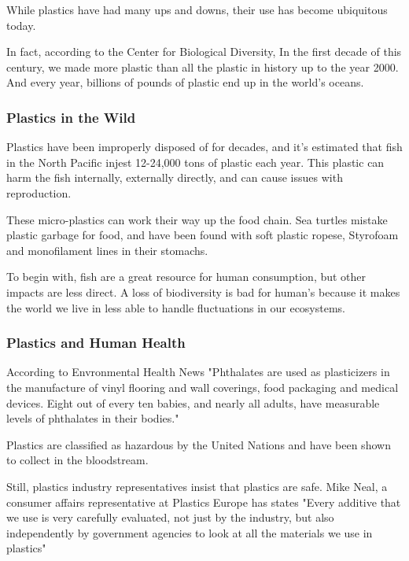 \documentclass[paper=a4, fontsize=11pt]{article}
\begin{document}
While plastics have had many ups and downs, their use has become ubiquitous today.

In fact, according to the Center for Biological Diversity, In the first decade of this century, 
we made more plastic than all the plastic in history up to the year 2000. 
And every year, billions of pounds of plastic end up in the world’s oceans. \cite{biodiverse}

\subsubsection{Plastics in the Wild}

Plastics have been improperly disposed of for decades, and it's estimated that fish in the North Pacific injest 12-24,000 tons of plastic each year. \cite{biodiverse}
This plastic can harm
the fish internally, externally directly, and can cause issues with reproduction. 

These micro-plastics can work their way up the food chain. Sea turtles mistake plastic garbage for food, and have 
been found with soft plastic ropese, Styrofoam and monofilament lines in their stomachs.\cite{biodiverse}


To begin with, fish are a great resource for human consumption, but other impacts are less direct. A loss of biodiversity is bad for human's because it makes 
the world we live in less able to handle fluctuations in our ecosystems. \cite{biodiverse}

\subsubsection{Plastics and Human Health}
According to Envronmental Health News "Phthalates are used as plasticizers in the manufacture of vinyl 
flooring and wall coverings, food packaging and medical devices. Eight out of every ten babies, and nearly 
all adults, have measurable levels of phthalates in their bodies." \cite{ehn}

Plastics are classified as hazardous by the United Nations and have been shown to collect in the bloodstream. \cite{nature}

Still, plastics industry representatives insist that plastics are safe. Mike Neal, a consumer affairs representative at Plastics Europe 
has states "Every additive that we use is very carefully evaluated, not just by the industry, but also independently by government agencies to look at all the materials we use in plastics"
\end{document}
